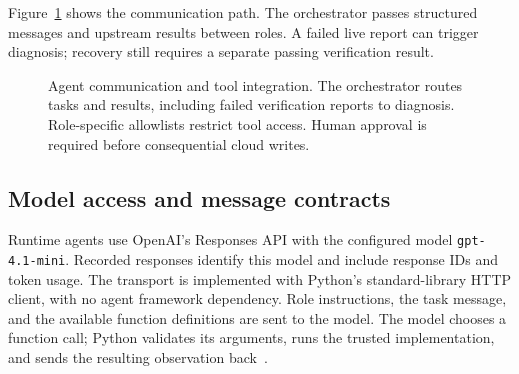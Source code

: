 \documentclass[11pt]{article}
\begin{document}
Figure~\ref{fig:agents} shows the communication path. The orchestrator passes structured messages and upstream results between roles. A failed live report can trigger diagnosis; recovery still requires a separate passing verification result.

\begin{figure}[htbp]
\centering
{}
\caption{Agent communication and tool integration. The orchestrator routes tasks and results, including failed verification reports to diagnosis. Role-specific allowlists restrict tool access. Human approval is required before consequential cloud writes.}
\label{fig:agents}
\end{figure}

\subsection{Model access and message contracts}
Runtime agents use OpenAI's Responses API with the configured model \texttt{gpt-4.1-mini}. Recorded responses identify this model and include response IDs and token usage. The transport is implemented with Python's standard-library HTTP client, with no agent framework dependency. Role instructions, the task message, and the available function definitions are sent to the model. The model chooses a function call; Python validates its arguments, runs the trusted implementation, and sends the resulting observation back~\cite{functioncalling}.
\end{document}
